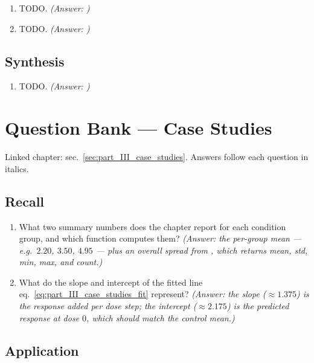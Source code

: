 \documentclass[
]{article}
\providecommand{\tightlist}{%
  \setlength{\itemsep}{0pt}\setlength{\parskip}{0pt}}
\theoremstyle{plain}
\theoremstyle{definition}
\begin{document}
\begin{enumerate}
\def\labelenumi{\arabic{enumi}.}
\setcounter{enumi}{2}
\item
  TODO. \emph{(Answer: )}
\item
  TODO. \emph{(Answer: )}
\end{enumerate}

\subsection{Synthesis}\label{synthesis-9}

\begin{enumerate}
\def\labelenumi{\arabic{enumi}.}
\setcounter{enumi}{4}
\item
  TODO. \emph{(Answer: )}
\end{enumerate}

\newpage

\section{Question Bank --- Case
Studies}\label{sec:q_part_III_case_studies}

Linked chapter: sec.~\ref{sec:part_III_case_studies}. Answers follow
each question in italics.

\subsection{Recall}\label{recall-10}

\begin{enumerate}
\def\labelenumi{\arabic{enumi}.}
\tightlist
\item
  What two summary numbers does the chapter report for each condition
  group, and which function computes them? \emph{(Answer: the per-group
  mean --- e.g.~\(2.20\), \(3.50\), \(4.95\) --- plus an overall spread
  from , which returns
  mean, std, min, max, and count.)}
\item
  What do the slope and intercept of the fitted line
  eq.~\ref{eq:part_III_case_studies_fit} represent? \emph{(Answer: the
  slope (\(\approx 1.375\)) is the response added per dose step; the
  intercept (\(\approx 2.175\)) is the predicted response at dose \(0\),
  which should match the control mean.)}
\end{enumerate}

\subsection{Application}\label{application-10}
\end{document}
